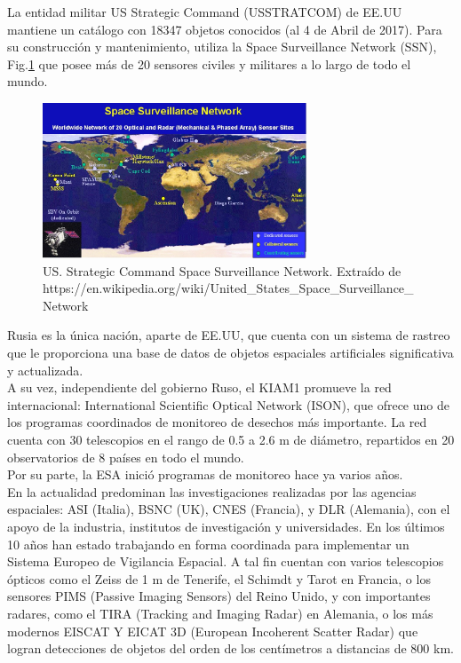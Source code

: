 La entidad militar US Strategic Command (USSTRATCOM) de EE.UU mantiene un catálogo con 18347 objetos conocidos (al 4 de Abril de 2017). Para su construcci\'on y mantenimiento, utiliza la Space Surveillance Network (SSN), Fig.\ref{fig:usnet}  que posee m\'as de 20 sensores civiles y militares a lo largo de todo el mundo.\\

\begin{figure}[!h]
  \centering
  \includegraphics[width=0.7\textwidth]{imagenes/SpSNet}
  \caption[USSTRATCOM - SSN]{US. Strategic Command Space Surveillance Network. Extra\'ido de https://en.wikipedia.org/wiki/United\_States\_Space\_Surveillance\_Network}
  \label{fig:usnet}
\end{figure}

Rusia es la única nación, aparte de EE.UU, que cuenta con un sistema de rastreo que le proporciona una base de datos de objetos espaciales artificiales significativa y actualizada.\\
A su vez, independiente del gobierno Ruso, el KIAM1 promueve la red internacional: International Scientific Optical Network (ISON), que ofrece uno de los programas coordinados de monitoreo de desechos más importante.
La red cuenta con 30 telescopios en el rango de 0.5 a 2.6 m de diámetro, repartidos en 20 observatorios de 8 países en todo el mundo.\\

Por su parte, la ESA inició programas de monitoreo hace ya varios años.\\
En la actualidad predominan las investigaciones realizadas por las agencias espaciales: ASI (Italia), BSNC (UK), CNES (Francia), y DLR (Alemania), con el apoyo de la industria, institutos de investigación y universidades. En los últimos 10 años han estado trabajando en forma coordinada para implementar un Sistema Europeo de Vigilancia Espacial.
A tal fin cuentan con varios telescopios ópticos como el Zeiss de 1 m de Tenerife, el Schimdt y Tarot en Francia, o los sensores PIMS (Passive Imaging Sensors) del Reino Unido, y con importantes radares, como el TIRA (Tracking and Imaging Radar) en Alemania, o los más modernos EISCAT Y EICAT 3D (European Incoherent Scatter Radar) que logran detecciones de objetos del orden de los centímetros a distancias de 800 km.


